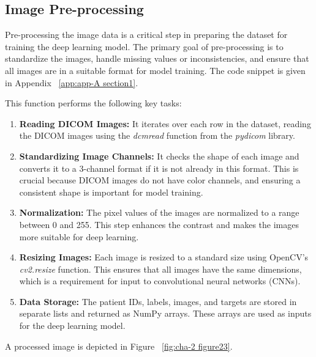 \subsection{Image Pre-processing}
\label{subsec:chap2 section 2.1}

Pre-processing the image data is a critical step in preparing the dataset for training the deep learning model. The primary goal of pre-processing is to standardize the images, handle missing values or inconsistencies, and ensure that all images are in a suitable format for model training. The code snippet is given in Appendix ~\ref{app:app-A section1}.

This function performs the following key tasks:
\begin{enumerate}
    \item \textbf{Reading DICOM Images:} It iterates over each row in the dataset, reading the DICOM images using the \emph{dcmread} function from the \emph{pydicom} library.
    \item \textbf{Standardizing Image Channels:} It checks the shape of each image and converts it to a 3-channel format if it is not already in this format. This is crucial because DICOM images do not have color channels, and ensuring a consistent shape is important for model training.
    \item \textbf{Normalization:} The pixel values of the images are normalized to a range between 0 and 255. This step enhances the contrast and makes the images more suitable for deep learning.
    \item \textbf{Resizing Images:} Each image is resized to a standard size using OpenCV's \emph{cv2.resize} function. This ensures that all images have the same dimensions, which is a requirement for input to convolutional neural networks (CNNs).
    \item \textbf{Data Storage:} The patient IDs, labels, images, and targets are stored in separate lists and returned as NumPy arrays. These arrays are used as inputs for the deep learning model.
\end{enumerate}

A processed image is depicted in Figure ~\ref{fig:cha-2 figure23}.

